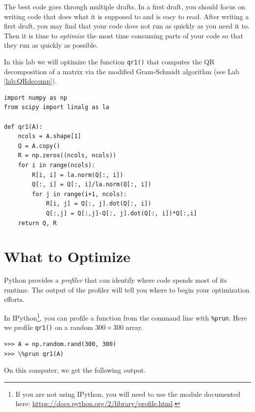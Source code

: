\label{lab:ProfilingCode}

The best code goes through multiple drafts.
In a first draft, you should focus on writing code that does what it is supposed to and is easy to read.
After writing a first draft, you may find that your code does not run as quickly as you need it to.
Then it is time to \emph{optimize} the most time consuming parts of your code so that they run as quickly as possible.

In this lab we will optimize the function \texttt{qr1()} that computes the QR decomposition of a matrix via the modified Gram-Schmidt algorithm (see Lab \ref{lab:QRdecomp}).
\begin{lstlisting}
import numpy as np
from scipy import linalg as la

def qr1(A):
    ncols = A.shape[1]
    Q = A.copy()
    R = np.zeros((ncols, ncols))
    for i in range(ncols):
        R[i, i] = la.norm(Q[:, i])
        Q[:, i] = Q[:, i]/la.norm(Q[:, i])
        for j in range(i+1, ncols):
            R[i, j] = Q[:, j].dot(Q[:, i])
            Q[:,j] = Q[:,j]-Q[:, j].dot(Q[:, i])*Q[:,i]
    return Q, R
\end{lstlisting}

\section*{What to Optimize}
Python provides a \emph{profiler} that can identify where code spends most of its runtime.
The output of the profiler will tell you where to begin your optimization efforts.

In IPython\footnote{If you are not using IPython, you will need to use the  module documented here: \url{https://docs.python.org/2/library/profile.html}.}, 
you can profile a function from the command line with \texttt{\%prun}.
Here we profile \texttt{qr1()} on a random $300 \times 300$ array.
\begin{lstlisting}
>>> A = np.random.rand(300, 300)
>>> \%prun qr1(A)
\end{lstlisting}

On this computer, we get the following output.

